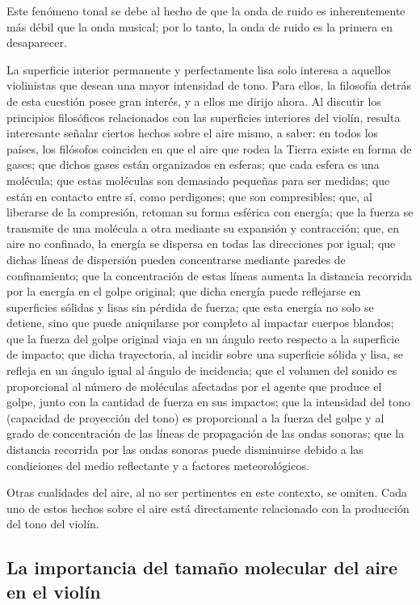 \documentclass[12pt]{book}
\begin{document}
Este fenómeno tonal se debe al hecho de que la onda de ruido es inherentemente más débil que la onda musical; por lo tanto, la onda de ruido es la primera en desaparecer.

La superficie interior permanente y perfectamente lisa solo interesa a aquellos violinistas que desean una mayor intensidad de tono. Para ellos, la filosofía detrás de esta cuestión posee gran interés, y a ellos me dirijo ahora.
Al discutir los principios filosóficos relacionados con las superficies interiores del violín, resulta interesante señalar ciertos hechos sobre el aire mismo, a saber: en todos los países, los filósofos coinciden en que el aire que rodea la Tierra existe en forma de gases; que dichos gases están organizados en esferas; que cada esfera es una molécula; que estas moléculas son demasiado pequeñas para ser medidas; que están en contacto entre sí, como perdigones; que son compresibles; que, al liberarse de la compresión, retoman su forma esférica con energía; que la fuerza se transmite de una molécula a otra mediante su expansión y contracción; que, en aire no confinado, la energía se dispersa en todas las direcciones por igual; que dichas líneas de dispersión pueden concentrarse mediante paredes de confinamiento; que la concentración de estas líneas aumenta la distancia recorrida por la energía en el golpe original; que dicha energía puede reflejarse en superficies sólidas y lisas sin pérdida de fuerza; que esta energía no solo se detiene, sino que puede aniquilarse por completo al impactar cuerpos blandos; que la fuerza del golpe original viaja en un ángulo recto respecto a la superficie de impacto; que dicha trayectoria, al incidir sobre una superficie sólida y lisa, se refleja en un ángulo igual al ángulo de incidencia; que el volumen del sonido es proporcional al número de moléculas afectadas por el agente que produce el golpe, junto con la cantidad de fuerza en sus impactos; que la intensidad del tono (capacidad de proyección del tono) es proporcional a la fuerza del golpe y al grado de concentración de las líneas de propagación de las ondas sonoras; que la distancia recorrida por las ondas sonoras puede disminuirse debido a las condiciones del medio reflectante y a factores meteorológicos.

Otras cualidades del aire, al no ser pertinentes en este contexto, se omiten. Cada uno de estos hechos sobre el aire está directamente relacionado con la producción del tono del violín.

\subsection*{La importancia del tamaño molecular del aire en el violín}
\end{document}
